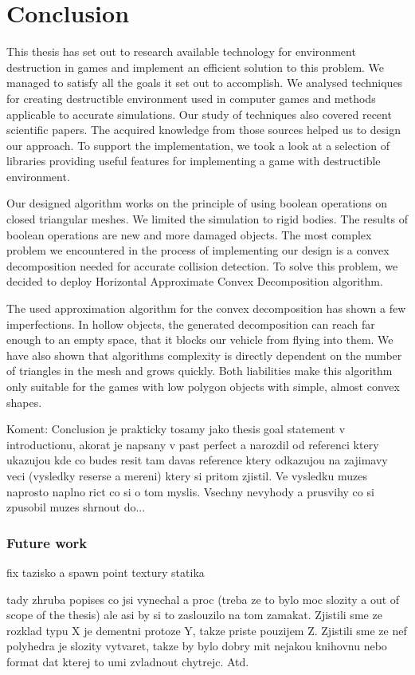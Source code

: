 \chapter*{Conclusion}

This thesis has set out to research available technology for environment destruction in games and implement an efficient solution to this problem. We managed to satisfy all the goals it set out to accomplish. We analysed techniques for creating destructible environment used in computer games and methods applicable to accurate simulations. Our study of techniques also covered recent scientific papers. The acquired knowledge from those sources helped us to design our approach. To support the implementation, we took a look at a selection of libraries providing useful features for implementing a game with destructible environment.

Our designed algorithm works on the principle of using boolean operations on closed triangular meshes. We limited the simulation to rigid bodies. The results of boolean operations are new and more damaged objects. The most complex problem we encountered in the process of implementing our design is a convex decomposition needed for accurate collision detection. To solve this problem, we decided to deploy Horizontal Approximate Convex Decomposition algorithm.

The used approximation algorithm for the convex decomposition has shown a few imperfections. In hollow objects, the generated decomposition can reach far enough to an empty space, that it blocks our vehicle from flying into them. We have also shown that algorithms complexity is directly dependent on the number of triangles in the mesh and grows quickly. Both liabilities make this algorithm only suitable for the games with low polygon objects with simple, almost convex shapes.



Koment: Conclusion je prakticky tosamy jako thesis goal statement v introductionu, akorat je napsany v past perfect a narozdil od referenci ktery ukazujou kde co budes resit tam davas reference ktery odkazujou na zajimavy veci (vysledky reserse a mereni) ktery si pritom zjistil. Ve vysledku muzes naprosto naplno rict co si o tom myslis. Vsechny nevyhody a prusvihy co si zpusobil muzes shrnout do...

\subsection*{Future work}
fix tazisko a spawn point
textury
statika


tady zhruba popises co jsi vynechal a proc (treba ze to bylo moc slozity a out of scope of the thesis) ale asi by si to zaslouzilo na tom zamakat. Zjistili sme ze rozklad typu X je dementni protoze Y, takze priste pouzijem Z. Zjistili sme ze nef polyhedra je slozity vytvaret, takze by bylo dobry mit nejakou knihovnu nebo format dat kterej to umi zvladnout chytrejc. Atd.
